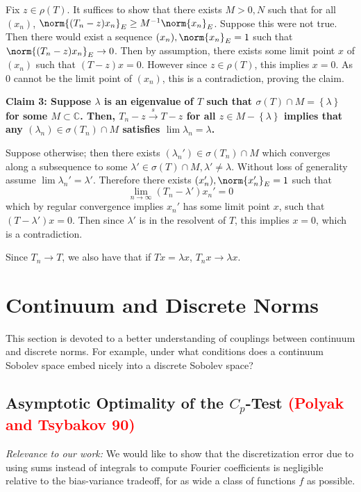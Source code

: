 \documentclass{article}
\newcommand{\set}[1]{\left\{#1\right\}}
\newcommand{\1}{\mathbf{1}}
\theoremstyle{alden}
\theoremstyle{aldenthm}
\theoremstyle{definition}
\theoremstyle{remark}
\begin{document}
Fix $z \in \rho(T)$. It suffices to show that there exists $M > 0, N$ such that for all $(x_n)$, $\norm{(T_n - z)x_n}_{E} \geq M^{-1} \norm{x_n}_E$. Suppose this were not true. Then there would exist a sequence $(x_n), \norm{x_n}_E = 1$ such that $\norm{(T_n - z)x_n}_{E} \to 0$. Then by assumption, there exists some limit point $x$ of $(x_n)$ such that $(T - z)x = 0$. However since $z \in \rho(T)$, this implies $x = 0$. As $0$ cannot be the limit point of $(x_n)$, this is a contradiction, proving the claim.

\textbf{Claim 3: Suppose $\lambda$ is an eigenvalue of $T$ such that $\sigma(T) \cap M = \set{\lambda}$ for some $M \subset \mathbb{C}$. Then, $T_n - z \overset{s}{\to} T - z$ for all $z \in M - \set{\lambda}$ implies that any $(\lambda_n) \in \sigma(T_n) \cap M$ satisfies $\lim \lambda_n = \lambda$.}
	
Suppose otherwise; then there exists $(\lambda_n') \in \sigma(T_n) \cap M$ which converges along a subsequence to some $\lambda' \in \sigma(T) \cap M, \lambda' \neq \lambda$. Without loss of generality assume $\lim \lambda_n' = \lambda'$. Therefore there exists $(x_n'), \norm{x_n'}_E = 1$ such that
\begin{equation*}
\lim_{n \to \infty} (T_n - \lambda')x_n' = 0
\end{equation*}
which by regular convergence implies $x_n'$ has some limit point $x$, such that $(T - \lambda')x = 0$. Then since $\lambda'$ is in the resolvent of $T$, this implies $x = 0$, which is a contradiction.

Since $T_n \to T$, we also have that if $Tx = \lambda x$, $T_nx \to \lambda x$.

\section{Continuum and Discrete Norms}
This section is devoted to a better understanding of couplings between continuum and discrete norms. For example, under what conditions does a continuum Sobolev space embed nicely into a discrete Sobolev space?

\subsection{Asymptotic Optimality of the $C_p$-Test \textcolor{red}{(Polyak and Tsybakov 90)}}

\textit{Relevance to our work:} We would like to show that the discretization error due to using sums instead of integrals to compute Fourier coefficients is negligible relative to the bias-variance tradeoff, for as wide a class of functions $f$ as possible.
\end{document}
